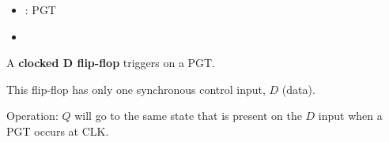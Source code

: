 \begin{itemize}
  \item {}: PGT
  \item {}
\end{itemize}

    \par A \textbf{clocked D flip-flop} triggers on a PGT.
    \par This flip-flop has only one synchronous control input, $D$ (data).
    \par Operation: $Q$ will go to the same state that is present on the $D$ input
    when a PGT occurs at CLK.
